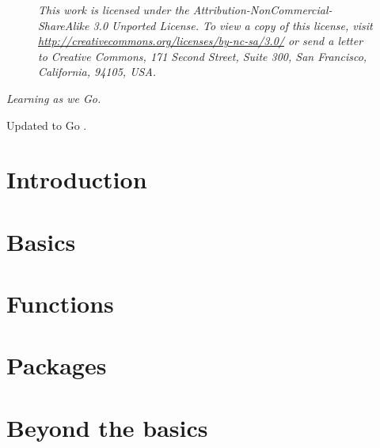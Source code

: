 \documentclass[a4paper,twoside,openleft]{blocksbook}
\begin{document}
\newpage

\thispagestyle{empty}
\begin{figure}[H]
\begin{center}
\emph{
This work is licensed under the Attribution-NonCommercial-ShareAlike 3.0 Unported License. To
view a copy of this license, visit \url{http://creativecommons.org/licenses/by-nc-sa/3.0/} 
or send a letter
to Creative Commons, 171 Second Street, Suite 300, San Francisco, California, 94105, USA.}
\end{center}
\end{figure}
\begin{center}
\vfill
\emph{Learning as we Go.}

\tiny{Updated to Go .}
\vspace{.2\stockheight}
\end{center}

\clearpage

\tableofcontents*
\listoffigures*
\listoftables*
\listofcode* 
\listofex* 
\clearpage


\chapter{Introduction}
\label{chap:intro}


\chapter{Basics}
\label{chap:basics}


\chapter{Functions}
\label{chap:functions}


\chapter{Packages}
\label{chap:packages}


\chapter{Beyond the basics}
\label{chap:beyond}

\end{document}
